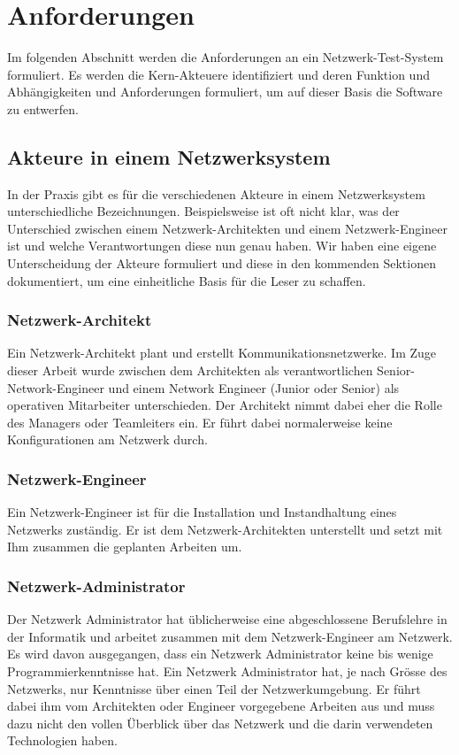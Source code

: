 \documentclass[]{subfiles}
\begin{document}
\section{Anforderungen}
    Im folgenden Abschnitt werden die Anforderungen an ein Netzwerk-Test-System formuliert.
    Es werden die Kern-Akteuere identifiziert und deren Funktion und Abhängigkeiten 
    und Anforderungen formuliert, um auf dieser Basis die Software zu entwerfen.
    
    \subsection{Akteure in einem Netzwerksystem}
    In der Praxis gibt es für die verschiedenen Akteure in einem Netzwerksystem
    unterschiedliche Bezeichnungen. Beispielsweise ist oft nicht klar, was der 
    Unterschied zwischen einem Netzwerk-Architekten und einem Netzwerk-Engineer
    ist und welche Verantwortungen diese nun genau haben. Wir haben eine eigene
    Unterscheidung der Akteure formuliert und diese in den kommenden Sektionen
    dokumentiert, um eine einheitliche Basis für die Leser zu schaffen.

    \subsubsection*{Netzwerk-Architekt}
    Ein Netzwerk-Architekt plant und erstellt Kommunikationsnetzwerke.
    Im Zuge dieser Arbeit wurde zwischen dem Architekten als verantwortlichen
    Senior-Network-Engineer und einem Network Engineer (Junior oder Senior)
    als operativen Mitarbeiter unterschieden. 
    Der Architekt nimmt dabei eher die Rolle des Managers oder Teamleiters ein. 
    Er führt dabei normalerweise keine Konfigurationen am Netzwerk durch.

    \subsubsection*{Netzwerk-Engineer}
    Ein Netzwerk-Engineer ist für die Installation und Instandhaltung 
    eines Netzwerks zuständig. 
    Er ist dem Netzwerk-Architekten unterstellt und setzt mit Ihm
    zusammen die geplanten Arbeiten um. 

    \subsubsection*{Netzwerk-Administrator}
    Der Netzwerk Administrator hat üblicherweise eine abgeschlossene Berufslehre 
    in der Informatik und arbeitet zusammen mit dem Netzwerk-Engineer am Netzwerk. 
    Es wird davon ausgegangen, dass ein Netzwerk Administrator keine bis wenige 
    Programmierkenntnisse hat. 
    Ein Netzwerk Administrator hat, je nach Grösse des Netzwerks, 
    nur Kenntnisse über einen Teil der Netzwerkumgebung. 
    Er führt dabei ihm vom Architekten oder Engineer vorgegebene Arbeiten 
    aus und muss dazu nicht den vollen Überblick über das Netzwerk und die 
    darin verwendeten Technologien haben.
\end{document}
